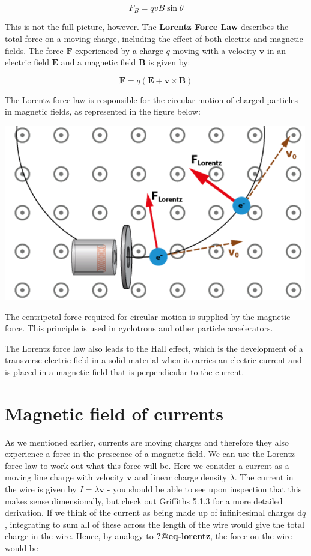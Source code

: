 \documentclass[
  letterpaper,
  DIV=11,
  numbers=noendperiod]{scrreprt}
\begin{document}
\[
F_B = qvB \sin\theta
\]

This is not the full picture, however. The \textbf{Lorentz Force Law}
describes the total force on a moving charge, including the effect of
both electric and magnetic fields. The force \(\mathrm{\mathbf{F}}\)
experienced by a charge \(q\) moving with a velocity
\(\mathrm{\mathbf{v}}\) in an electric field \(\mathrm{\mathbf{E}}\) and
a magnetic field \(\mathrm{\mathbf{B}}\) is given by:

\[
\mathrm{\mathbf{F}}= q(\mathrm{\mathbf{E}}+ \mathrm{\mathbf{v}}\times \mathrm{\mathbf{B}})
\]

The Lorentz force law is responsible for the circular motion of charged
particles in magnetic fields, as represented in the figure below:

\includegraphics[width=5.20833in,height=\textheight]{Figures/lorentz_motion.png}

The centripetal force required for circular motion is supplied by the
magnetic force. This principle is used in cyclotrons and other particle
accelerators.

The Lorentz force law also leads to the Hall effect, which is the
development of a transverse electric field in a solid material when it
carries an electric current and is placed in a magnetic field that is
perpendicular to the current.

\section{Magnetic field of currents}\label{magnetic-field-of-currents}

As we mentioned earlier, currents are moving charges and therefore they
also experience a force in the prescence of a magnetic field. We can use
the Lorentz force law to work out what this force will be. Here we
consider a current as a moving line charge with velocity
\(\mathrm{\mathbf{v}}\) and linear charge density \(\lambda\). The
current in the wire is given by \(I = \lambda \mathrm{\mathbf{v}}\) -
you should be able to see upon inspection that this makes sense
dimensionally, but check out Griffiths 5.1.3 for a more detailed
derivation. If we think of the current as being made up of infinitesimal
charges \(\mathrm{d} q\), integrating to sum all of these across the
length of the wire would give the total charge in the wire. Hence, by
analogy to \textbf{?@eq-lorentz}, the force on the wire would be
\end{document}
